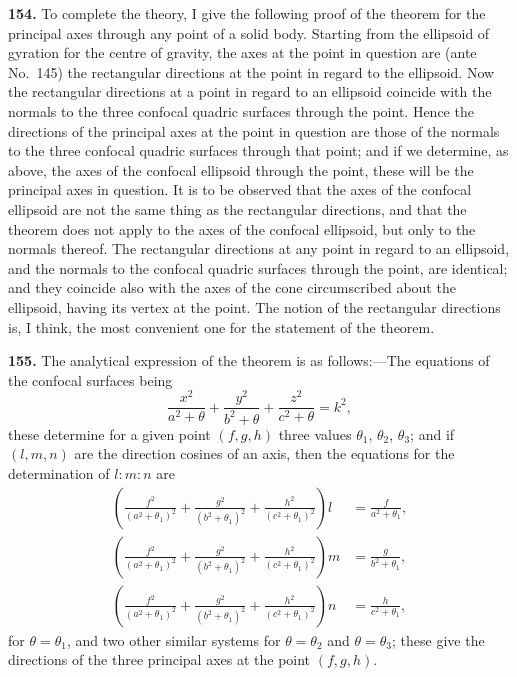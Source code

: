 \documentclass[11pt,a4paper]{article}
\theoremstyle{definition}
\begin{document}
\textbf{154.} To complete the theory, I give the following proof of the theorem for the principal axes through any point of a solid body. Starting from the ellipsoid of gyration for the centre of gravity, the axes at the point in question are (ante No.~145) the rectangular directions at the point in regard to the ellipsoid. Now the rectangular directions at a point in regard to an ellipsoid coincide with the normals to the three confocal quadric surfaces through the point. Hence the directions of the principal axes at the point in question are those of the normals to the three confocal quadric surfaces through that point; and if we determine, as above, the axes of the confocal ellipsoid through the point, these will be the principal axes in question. It is to be observed that the axes of the confocal ellipsoid are not the same thing as the rectangular directions, and that the theorem does not apply to the axes of the confocal ellipsoid, but only to the normals thereof. The rectangular directions at any point in regard to an ellipsoid, and the normals to the confocal quadric surfaces through the point, are identical; and they coincide also with the axes of the cone circumscribed about the ellipsoid, having its vertex at the point. The notion of the rectangular directions is, I think, the most convenient one for the statement of the theorem.

\textbf{155.} The analytical expression of the theorem is as follows:---The equations of the confocal surfaces being
\[
\frac{x^2}{a^2 + \theta} + \frac{y^2}{b^2 + \theta} + \frac{z^2}{c^2 + \theta} = k^2,
\]
these determine for a given point $(f, g, h)$ three values $\theta_1$, $\theta_2$, $\theta_3$; and if $(l, m, n)$ are the direction cosines of an axis, then the equations for the determination of $l : m : n$ are
\begin{align*}
\left(\frac{f^2}{(a^2 + \theta_1)^2} + \frac{g^2}{(b^2 + \theta_1)^2} + \frac{h^2}{(c^2 + \theta_1)^2}\right) l &= \frac{f}{a^2 + \theta_1}, \\
\left(\frac{f^2}{(a^2 + \theta_1)^2} + \frac{g^2}{(b^2 + \theta_1)^2} + \frac{h^2}{(c^2 + \theta_1)^2}\right) m &= \frac{g}{b^2 + \theta_1}, \\
\left(\frac{f^2}{(a^2 + \theta_1)^2} + \frac{g^2}{(b^2 + \theta_1)^2} + \frac{h^2}{(c^2 + \theta_1)^2}\right) n &= \frac{h}{c^2 + \theta_1},
\end{align*}
for $\theta = \theta_1$, and two other similar systems for $\theta = \theta_2$ and $\theta = \theta_3$; these give the directions of the three principal axes at the point $(f, g, h)$.
\end{document}
